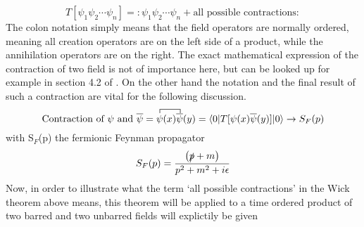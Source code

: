 \begin{equation*}
	T\left[\psi_1\psi_2\cdots\psi_n\right]=:\psi_1\psi_2\cdots\psi_n+\text{all possible contractions}:
\end{equation*}
The colon notation simply means that the field operators are normally ordered, meaning all creation operators are on the left side of a product, while the annihilation operators are on the right. The exact mathematical expression of the contraction of two field is not of importance here, but can be looked up for example in section 4.2 of \cite{Kopp:2016}. On the other hand the notation and the final result of such a contraction are vital for the following discussion.
\begin{equation*}
\text{Contraction of $\psi$ and $\overline{\psi}$}=
\contraction{}{\psi}{(x)}{\bar{\psi}}
\psi(x)\overline{\psi}(y)=\braket{0|T[\psi(x)\overline{\psi}(y)]|0}\rightarrow S_F(p)
\end{equation*}
with S$_F$(p) the fermionic Feynman propagator
\begin{equation*}
	S_F(p)=\frac{\left(\slashed p+m\right)}{p^2+m^2+i\epsilon}
\end{equation*}
Now, in order to illustrate what the term `all possible contractions' in the Wick theorem above means, this theorem will be applied to a time ordered product of two barred and two unbarred fields will explictily be given
